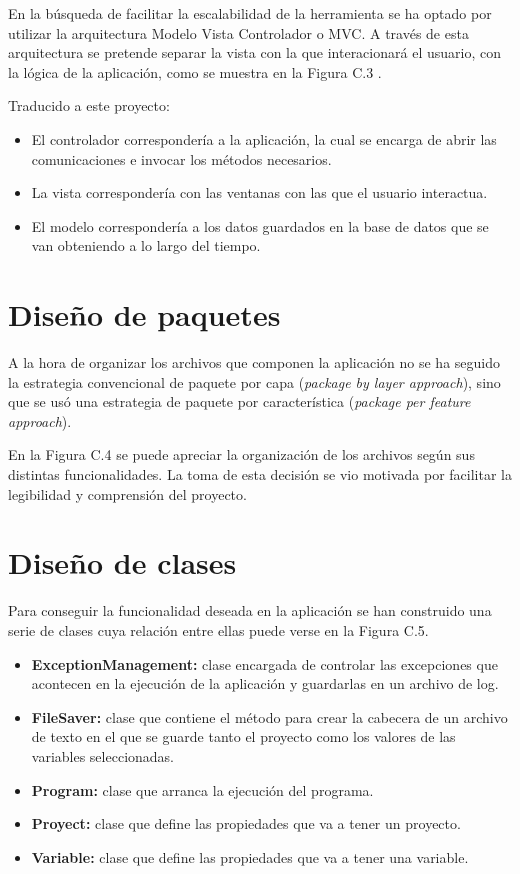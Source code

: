 En la búsqueda de facilitar la escalabilidad de la herramienta se ha optado por utilizar la arquitectura Modelo Vista Controlador o MVC. A través de esta arquitectura se pretende separar la vista con la que interacionará el usuario, con la lógica de la aplicación, como se muestra en la Figura C.3 \cite{web:mvc}.


Traducido a este proyecto:
\begin{itemize}
	\item El controlador correspondería a la aplicación, la cual se encarga de abrir las comunicaciones e invocar los métodos necesarios.
	\item La vista correspondería con las ventanas con las que el usuario interactua.
	\item El modelo correspondería a los datos guardados en la base de datos que se van obteniendo a lo largo del tiempo.
\end{itemize}

\section{Diseño de paquetes}

A la hora de organizar los archivos que componen la aplicación no se ha seguido la estrategia convencional de paquete por capa (\textit{package by layer approach}), sino que se usó una estrategia de paquete por característica (\textit{package per feature approach}).

En la Figura C.4 se puede apreciar la organización de los archivos según sus distintas funcionalidades. La toma de esta decisión se vio motivada por facilitar la legibilidad y comprensión del proyecto.


\section{Diseño de clases}

Para conseguir la funcionalidad deseada en la aplicación se han construido una serie de clases cuya relación entre ellas puede verse en la Figura C.5.

\begin{itemize}
	\item \textbf{ExceptionManagement:} clase encargada de controlar las excepciones que acontecen en la ejecución de la aplicación y guardarlas en un archivo de log.
	\item \textbf{FileSaver:} clase que contiene el método para crear la cabecera de un archivo de texto en el que se guarde tanto el proyecto como los valores de las variables seleccionadas.
	\item \textbf{Program:} clase que arranca la ejecución del programa.
	\item \textbf{Proyect:} clase que define las propiedades que va a tener un proyecto.
	\item \textbf{Variable:} clase que define las propiedades que va a tener una variable.
\end{itemize}

